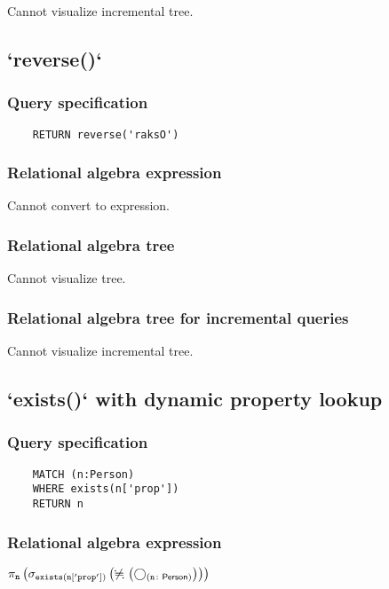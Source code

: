 	Cannot visualize incremental tree.
	\subsection{`reverse()`}

	\subsubsection*{Query specification}

	\begin{lstlisting}
	RETURN reverse('raksO')
	\end{lstlisting}


	\subsubsection*{Relational algebra expression}

	Cannot convert to expression.

	\subsubsection*{Relational algebra tree}

	Cannot visualize tree.

	\subsubsection*{Relational algebra tree for incremental queries}

	Cannot visualize incremental tree.
	\subsection{`exists()` with dynamic property lookup}

	\subsubsection*{Query specification}

	\begin{lstlisting}
	MATCH (n:Person)
	WHERE exists(n['prop'])
	RETURN n
	\end{lstlisting}


	\subsubsection*{Relational algebra expression}

	$\projection{\var{n}} \left(\selection{\mathtt{exists(n['prop'])}} \left(\alldifferent{} \left(\getvertices{n}{Person}\right)\right)\right)$

